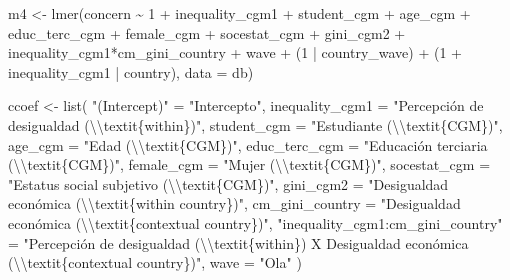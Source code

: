 \documentclass[
  12pt,
  a4paper,
]{article}
\newenvironment{Shaded}{\begin{snugshade}}{\end{snugshade}}
\newcommand{\AttributeTok}[1]{\textcolor[rgb]{0.77,0.63,0.00}{#1}}
\newcommand{\DecValTok}[1]{\textcolor[rgb]{0.00,0.00,0.81}{#1}}
\newcommand{\FunctionTok}[1]{\textcolor[rgb]{0.00,0.00,0.00}{#1}}
\newcommand{\NormalTok}[1]{#1}
\newcommand{\OtherTok}[1]{\textcolor[rgb]{0.56,0.35,0.01}{#1}}
\newcommand{\SpecialCharTok}[1]{\textcolor[rgb]{0.00,0.00,0.00}{#1}}
\newcommand{\StringTok}[1]{\textcolor[rgb]{0.31,0.60,0.02}{#1}}
\begin{document}
\begin{Shaded}
\begin{Highlighting}[]
\NormalTok{m4 }\OtherTok{\textless{}{-}} \FunctionTok{lmer}\NormalTok{(concern }\SpecialCharTok{\textasciitilde{}} \DecValTok{1} \SpecialCharTok{+}\NormalTok{ inequality\_cgm1 }\SpecialCharTok{+}\NormalTok{ student\_cgm }\SpecialCharTok{+}\NormalTok{ age\_cgm }\SpecialCharTok{+}\NormalTok{ educ\_terc\_cgm }\SpecialCharTok{+}\NormalTok{ female\_cgm }\SpecialCharTok{+}\NormalTok{ socestat\_cgm }\SpecialCharTok{+}\NormalTok{ gini\_cgm2 }\SpecialCharTok{+}\NormalTok{ inequality\_cgm1}\SpecialCharTok{*}\NormalTok{cm\_gini\_country }\SpecialCharTok{+}\NormalTok{ wave }\SpecialCharTok{+}\NormalTok{ (}\DecValTok{1} \SpecialCharTok{|}\NormalTok{ country\_wave) }\SpecialCharTok{+}\NormalTok{ (}\DecValTok{1} \SpecialCharTok{+}\NormalTok{ inequality\_cgm1 }\SpecialCharTok{|}\NormalTok{ country), }\AttributeTok{data =}\NormalTok{ db)}


\NormalTok{ccoef }\OtherTok{\textless{}{-}} \FunctionTok{list}\NormalTok{(}
  \StringTok{"(Intercept)"} \OtherTok{=} \StringTok{"Intercepto"}\NormalTok{,}
  \AttributeTok{inequality\_cgm1 =} \StringTok{"Percepción de desigualdad (}\SpecialCharTok{\textbackslash{}\textbackslash{}}\StringTok{textit\{within\})"}\NormalTok{,}
  \AttributeTok{student\_cgm =} \StringTok{"Estudiante (}\SpecialCharTok{\textbackslash{}\textbackslash{}}\StringTok{textit\{CGM\})"}\NormalTok{,}
  \AttributeTok{age\_cgm =} \StringTok{"Edad (}\SpecialCharTok{\textbackslash{}\textbackslash{}}\StringTok{textit\{CGM\})"}\NormalTok{,}
  \AttributeTok{educ\_terc\_cgm =} \StringTok{"Educación terciaria (}\SpecialCharTok{\textbackslash{}\textbackslash{}}\StringTok{textit\{CGM\})"}\NormalTok{,}
  \AttributeTok{female\_cgm =} \StringTok{"Mujer (}\SpecialCharTok{\textbackslash{}\textbackslash{}}\StringTok{textit\{CGM\})"}\NormalTok{,}
  \AttributeTok{socestat\_cgm =} \StringTok{"Estatus social subjetivo (}\SpecialCharTok{\textbackslash{}\textbackslash{}}\StringTok{textit\{CGM\})"}\NormalTok{,}
  \AttributeTok{gini\_cgm2 =} \StringTok{"Desigualdad económica (}\SpecialCharTok{\textbackslash{}\textbackslash{}}\StringTok{textit\{within country\})"}\NormalTok{,}
  \AttributeTok{cm\_gini\_country =} \StringTok{"Desigualdad económica (}\SpecialCharTok{\textbackslash{}\textbackslash{}}\StringTok{textit\{contextual country\})"}\NormalTok{,}
  \StringTok{"inequality\_cgm1:cm\_gini\_country"} \OtherTok{=} \StringTok{"Percepción de desigualdad (}\SpecialCharTok{\textbackslash{}\textbackslash{}}\StringTok{textit\{within\}) X Desigualdad económica (}\SpecialCharTok{\textbackslash{}\textbackslash{}}\StringTok{textit\{contextual country\})"}\NormalTok{,}
  \AttributeTok{wave =} \StringTok{"Ola"}
\NormalTok{ )}


\end{Highlighting}
\end{Shaded}
\end{document}
